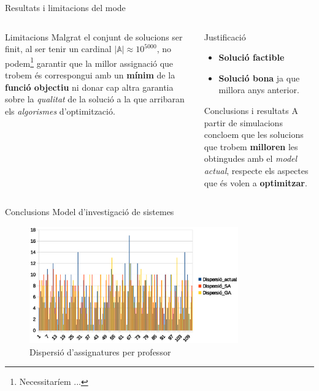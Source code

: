 \documentclass[twocolumn]{beamer}
\begin{document}
\begin{frame}{Resultats i limitacions del mode}
\begin{columns}[t]
	\begin{column}{.5\textwidth}
		\begin{block}{Limitacions}
			Malgrat el conjunt de solucions ser finit, al ser tenir un cardinal $|\mathbb{A}|\approx10^{5000}$, no podem\footnote{Necessitaríem ...} garantir que la millor assignació que trobem és correspongui amb un  \textbf{mínim} de la \textbf{funció objectiu} ni donar cap altra garantia sobre la \textit{qualitat} de la solució a la que arribaran els \textit{algorismes} d'optimització.
		\end{block}
		
	\end{column}
	\begin{column}{.5\textwidth}
		
		\begin{block}{Justificació}
			\begin{itemize}
				\item \textbf{Solució factible}
				\item \textbf{Solució bona} ja que millora anys anterior.
			\end{itemize}
		\end{block}
		\begin{block}{Conclusions i resultats}
			A partir de simulacions concloem que les solucions que trobem  \textbf{milloren} les obtingudes amb el \textit{model actual}, respecte els aspectes que és volen a \textbf{optimitzar}.
		\end{block}
	\end{column}
\end{columns}
\end{frame}
\begin{frame}{Conclusions Model d'investigació de sistemes}
\begin{figure}
	\includegraphics[width=9cm]{dispersio_diff_ga}
	\caption{Dispersió d'assignatures per professor}
\end{figure}
\end{frame}
\end{document}
